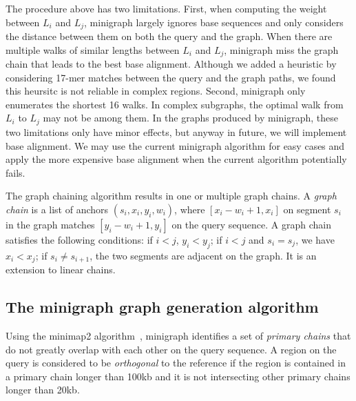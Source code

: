 \documentclass[twocolumn]{bmcart}
\begin{document}
The procedure above has two limitations. First, when computing the weight
between $L_i$ and $L_j$, minigraph largely ignores base sequences and only considers
the distance between them on both the query and the graph. When there are
multiple walks of similar lengths between $L_i$ and $L_j$, minigraph miss the
graph chain that leads to the best base alignment. Although we added a
heuristic by considering 17-mer matches between the query and the graph paths,
we found this heursitc is not reliable in complex regions. Second, minigraph only
enumerates the shortest 16 walks. In complex subgraphs, the optimal walk from
$L_i$ to $L_j$ may not be among them. In the graphs produced by minigraph,
these two limitations only have minor effects, but anyway in future, we
will implement base alignment. We may use the current minigraph algorithm
for easy cases and apply the more expensive base alignment when the current
algorithm potentially fails.

The graph chaining algorithm results in one or multiple graph chains.  A
\emph{graph chain} is a list of anchors $(s_i,x_i,y_i,w_i)$, where
$[x_i-w_i+1,x_i]$ on segment $s_i$ in the graph matches $[y_i-w_i+1,y_i]$ on
the query sequence. A graph chain satisfies the following conditions: if $i<j$,
$y_i<y_j$; if $i<j$ and $s_i=s_j$, we have $x_i<x_j$; if $s_i\not=s_{i+1}$, the
two segments are adjacent on the graph. It is an extension to linear chains.

\subsection*{The minigraph graph generation algorithm}

Using the minimap2 algorithm~\cite{Li:2018ab}, minigraph identifies a set of
\emph{primary chains} that do not greatly overlap with each other on the query
sequence. A region on the query is considered to be \emph{orthogonal} to the
reference if the region is contained in a primary chain longer than 100kb and
it is not intersecting other primary chains longer than 20kb.
\end{document}
